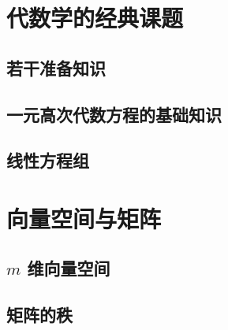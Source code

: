 \documentclass[a4paper, 11pt]{ctexbook}
\begin{document}
    \chapter{代数学的经典课题}
        \section{若干准备知识}
        \section{一元高次代数方程的基础知识}
        \section{线性方程组}
    \chapter{向量空间与矩阵}
        \section{$m$ 维向量空间}
            
        \section{矩阵的秩}
            
\end{document}
